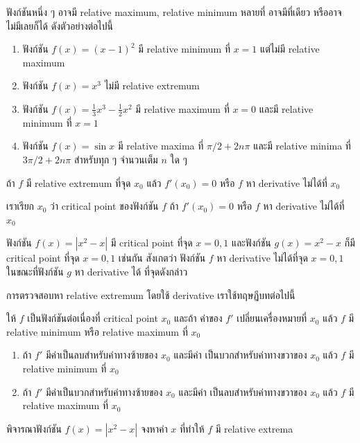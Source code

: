 \documentclass[
]{book}
\begin{document}
ฟังก์ชันหนึ่ง ๆ อาจมี relative maximum, relative minimum หลายที่ อาจมีที่เดียว
หรืออาจไม่มีเลยก็ได้ ดังตัวอย่างต่อไปนี้

\begin{enumerate}
\def\labelenumi{\arabic{enumi}.}
\item
  ฟังก์ชัน \(f(x) = (x-1)^2\) มี relative minimum ที่ \(x=1\) แต่ไม่มี relative
  maximum
\item
  ฟังก์ชัน \(f(x) = x^3\) ไม่มี relative extremum
\item
  ฟังก์ชัน \(f(x) = \frac{1}{3}x^3 - \frac{1}{2}x^2\) มี relative maximum ที่
  \(x=0\) และมี relative minimum ที่ \(x=1\)
\item
  ฟังก์ชัน \(f(x) = \sin x\) มี relative maxima ที่ \(\pi/2 + 2n\pi\) และมี
  relative minima ที่ \(3\pi/2 + 2n\pi\) สำหรับทุก ๆ จำนวนเต็ม \(n\) ใด ๆ
\end{enumerate}

ถ้า \(f\) มี relative extremum ที่จุด \(x_0\) แล้ว \(f'(x_0) = 0\) หรือ \(f\)
หา derivative ไม่ได้ที่ \(x_0\)

เราเรียก \(x_0\) ว่า critical point ของฟังก์ชัน \(f\) ถ้า \(f'(x_0) = 0\) หรือ
\(f\) หา derivative ไม่ได้ที่ \(x_0\)

ฟังก์ชัน \(f(x) = |x^2-x|\) มี critical point ที่จุด \(x=0,1\) และฟังก์ชัน
\(g(x) =
x^2-x\) ก็มี critical point ที่จุด \(x=0,1\) เช่นกัน สังเกตว่า ฟังก์ชัน \(f\) หา
derivative ไม่ได้ที่จุด \(x=0,1\) ในขณะที่ฟังก์ชัน \(g\) หา derivative ได้
ที่จุดดังกล่าว

การตรวจสอบหา relative extremum โดยใช้ derivative เราใช้ทฤษฏีบทต่อไปนี้

ให้ \(f\) เป็นฟังก์ชันต่อเนื่องที่ critical point \(x_0\) และถ้า ค่าของ \(f'\)
เปลี่ยนเครื่องหมายที่ \(x_0\) แล้ว \(f\) มี relative minimum หรือ relative
maximum ที่ \(x_0\)

\begin{enumerate}
\def\labelenumi{\arabic{enumi}.}
\item
  ถ้า \(f'\) มีค่าเป็นลบสำหรับค่าทางซ้ายของ \(x_0\) และมีค่า
  เป็นบวกสำหรับค่าทางขวาของ \(x_0\) แล้ว \(f\) มี relative minimum ที่ \(x_0\)
\item
  ถ้า \(f'\) มีค่าเป็นบวกสำหรับค่าทางซ้ายของ \(x_0\) และมีค่า
  เป็นลบสำหรับค่าทางขวาของ \(x_0\) แล้ว \(f\) มี relative maximum ที่ \(x_0\)
\end{enumerate}

พิจารณาฟังก์ชัน \(f(x) = |x^2-x|\) จงหาค่า \(x\) ที่ทำให้ \(f\) มี relative
extrema
\end{document}
